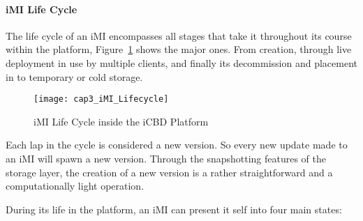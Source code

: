 \paragraph{iMI Life Cycle}
\label{subsub:icbd_imi_lifecycle}
The life cycle of an iMI encompasses all stages that take it throughout its course within the platform, Figure~\ref{fig:icbd_iMI_lifecycle} shows the major ones. From creation, through live deployment in use by multiple clients, and finally its decommission and placement in to temporary or cold storage.

\begin{figure}[htbp]
	\centering
	\texttt{[image: cap3\_iMI\_Lifecycle]}
	\caption{iMI Life Cycle inside the iCBD Platform}
	\label{fig:icbd_iMI_lifecycle}
\end{figure}

Each lap in the cycle is considered a new version. So every new update made to an iMI will spawn a new version. Through the snapshotting features of the storage layer, the creation of a new version is a rather straightforward and a computationally light operation.

During its life in the platform, an iMI can present it self into four main states:

